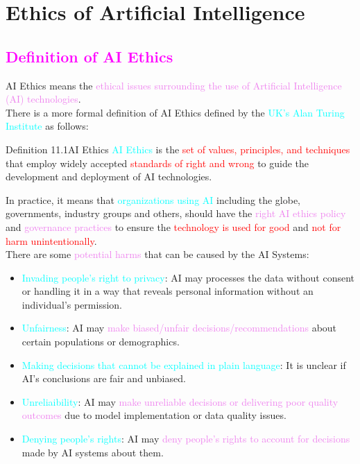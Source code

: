 \documentclass{book}
\begin{document}
\chapter{Ethics of Artificial Intelligence}
\textcolor{magenta}{\section{\textbf{Definition of AI Ethics}}}
AI Ethics means the \textcolor{violet}{ethical issues surrounding the use of Artificial Intelligence (AI) technologies}.\\
There is a more formal definition of AI Ethics defined by the \textcolor{cyan}{UK's Alan Turing Institute} as follows:
\begin{defBox}{Definition 11.1}{AI Ethics}
    \textcolor{cyan}{AI Ethics} is the \textcolor{red}{set of values, principles, and techniques} that employ widely accepted \textcolor{red}{standards of right and wrong} to guide the development and deployment of AI technologies.
\end{defBox}
In practice, it means that \textcolor{cyan}{organizations using AI} including the globe, governments, industry groups and others, should have the \textcolor{violet}{right AI ethics policy} and \textcolor{violet}{governance practices} to ensure the \textcolor{red}{technology is used for good} and \textcolor{red}{not for harm unintentionally}.\\
\vspace{3mm}
There are some \textcolor{violet}{potential harms} that can be caused by the AI Systems:
\begin{itemize}
    \item \textcolor{cyan}{Invading people's right to privacy}: AI may processes the data without consent or handling it in a way that reveals personal information without an individual's permission.
    \item \textcolor{cyan}{Unfairness}: AI may \textcolor{violet}{make biased/unfair decisions/recommendations} about certain populations or demographics.
    \item \textcolor{cyan}{Making decisions that cannot be explained in plain language}: It is unclear if AI's conclusions are fair and unbiased.
    \item \textcolor{cyan}{Unreliaibility}: AI may \textcolor{violet}{make unreliable decisions or delivering poor quality outcomes} due to model implementation or data quality issues.
    \item \textcolor{cyan}{Denying people's rights}: AI may \textcolor{violet}{deny people's rights to account for decisions} made by AI systems about them.
\end{itemize}
\end{document}
